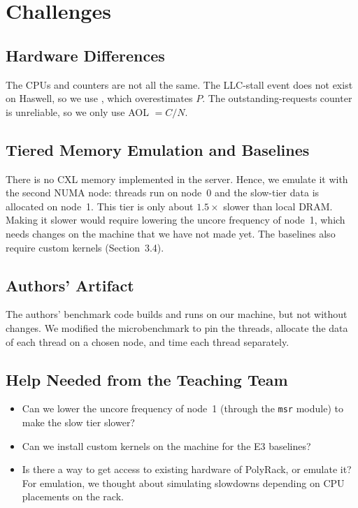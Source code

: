 \documentclass[10pt,a4paper]{article}
\begin{document}
\section{Challenges}

\subsection{Hardware Differences}
The CPUs and counters are not all the same. The LLC-stall event does not exist on Haswell, so we use , which overestimates $P$. The outstanding-requests counter is unreliable, so we only use AOL $= C/N$.

\subsection{Tiered Memory Emulation and Baselines}
There is no CXL memory implemented in the server. Hence, we emulate it with the second NUMA node: threads run on node~0 and the slow-tier data is allocated on node~1. This tier is only about $1.5\times$ slower than local DRAM. Making it slower would require lowering the uncore frequency of node~1, which needs changes on the machine that we have not made yet. The baselines also require custom kernels (Section~3.4).

\subsection{Authors' Artifact}
The authors' benchmark code builds and runs on our machine, but not without changes. We modified the microbenchmark to pin the threads, allocate the data of each thread on a chosen node, and time each thread separately.

\subsection{Help Needed from the Teaching Team}
\begin{itemize}
    \item Can we lower the uncore frequency of node~1 (through the \texttt{msr} module) to make the slow tier slower?
    \item Can we install custom kernels on the machine for the E3 baselines?
    \item Is there a way to get access to existing hardware of PolyRack, or emulate it? For emulation, we thought about simulating slowdowns depending on CPU placements on the rack.
\end{itemize}
\end{document}
